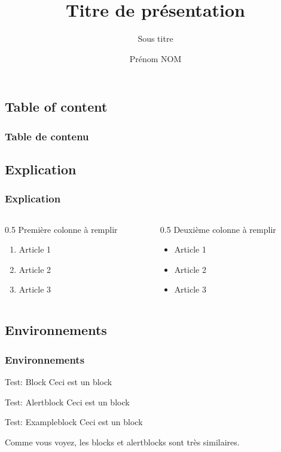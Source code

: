 \documentclass[svgnames,12pt,aspectratio=149]{beamer}
\author{Prénom NOM}
\title{Titre de présentation}
\subtitle{Sous titre}
\begin{document}
\begin{frame}[plain]
  \titlepage
\end{frame}
\begin{frame}
\section*{Table of content}
\frametitle{Table de contenu}
\tableofcontents
\end{frame}
\begin{frame}
\section{Explication}
    \frametitle{Explication}
    \begin{columns}
        \begin{column}{0.5\textwidth}
            Première colonne à remplir
\begin{enumerate}
    \item Article 1
    \item Article 2
    \item Article 3
\end{enumerate}
        \end{column}
        
        \begin{column}{0.5\textwidth}
        Deuxième colonne à remplir
\begin{itemize}
    \item Article 1
    \item Article 2
    \item Article 3
\end{itemize}


        \end{column}
    \end{columns}
\end{frame}

\begin{frame}
\section{Environnements}
  \frametitle{Environnements}
  \begin{block}{Test: Block}
    Ceci est un block
  \end{block}

  \begin{alertblock}{Test: Alertblock}
    Ceci est un block
  \end{alertblock}

  \begin{exampleblock}{Test: Exampleblock}
    Ceci est un block
  \end{exampleblock}

  Comme vous voyez, les \alert{blocks} et \alert{alertblocks} sont très similaires.
  
\end{frame}
\end{document}
